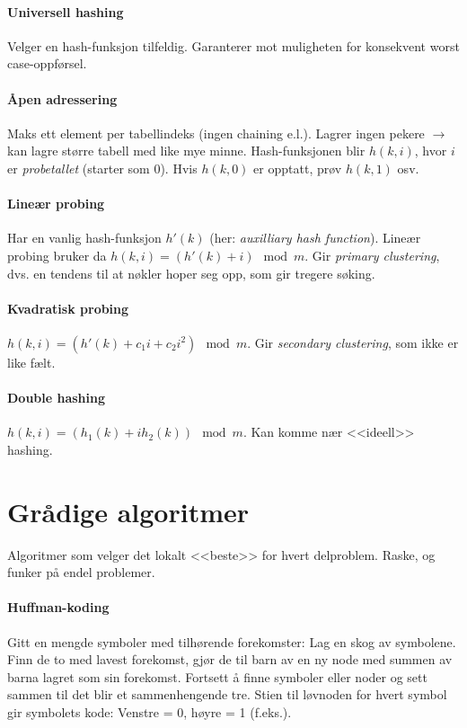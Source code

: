 \documentclass[a4paper]{article}
\begin{document}
\paragraph{Universell hashing} Velger en hash-funksjon tilfeldig. Garanterer mot muligheten for konsekvent worst case-oppførsel.
\paragraph{Åpen adressering} Maks ett element per tabellindeks (ingen chaining e.l.). Lagrer ingen pekere $\rightarrow$ kan lagre større tabell med like mye minne. Hash-funksjonen blir $h(k, i)$, hvor $i$ er \emph{probetallet} (starter som $0$). Hvis $h(k, 0)$ er opptatt, prøv $h(k, 1)$ osv.
\paragraph{Lineær probing} Har en vanlig hash-funksjon $h'(k)$ (her: \emph{auxilliary hash function}). Lineær probing bruker da $h(k, i) = (h'(k) + i) \mod m$. Gir \emph{primary clustering}, dvs. en tendens til at nøkler hoper seg opp, som gir tregere søking.
\paragraph{Kvadratisk probing} $h(k, i) = (h'(k) + c_{1}i + c_{2}i^{2}) \mod m$. Gir \emph{secondary clustering}, som ikke er like fælt.
\paragraph{Double hashing} $h(k, i) = (h_{1}(k) + ih_{2}(k)) \mod m$. Kan komme nær <<ideell>> hashing.



\section{Grådige algoritmer}
Algoritmer som velger det lokalt <<beste>> for hvert delproblem. Raske, og funker på endel problemer.
\paragraph{Huffman-koding} Gitt en mengde symboler med tilhørende forekomster: Lag en skog av symbolene. Finn de to med lavest forekomst, gjør de til barn av en ny node med summen av barna lagret som sin forekomst. Fortsett å finne symboler eller noder og sett sammen til det blir et sammenhengende tre. Stien til løvnoden for hvert symbol gir symbolets kode: Venstre = 0, høyre = 1 (f.eks.).
\end{document}
